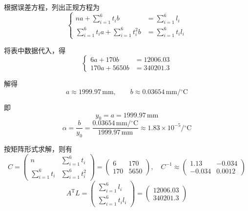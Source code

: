 \documentclass[UTF8,zihao=-4]{ctexart}
\begin{document}
根据误差方程，列出正规方程为
\begin{equation*}
\left\{
\begin{aligned}
    na+\sum_{i=1}^{6}t_i b&=\sum_{i=1}^{6}l_i\\
    \sum_{i=1}^{6}t_i a+\sum_{i=1}^{6}t_i^2 b&=\sum_{i=1}^{6}t_i l_i
\end{aligned}
\right.
\end{equation*}

将表中数据代入，得
\begin{equation*}
\left\{
\begin{aligned}
    6a+170b&=12006.03\\
    170a+5650b&=340201.3
\end{aligned}
\right.
\end{equation*}

解得
\begin{equation*}
    a\approx1999.97\,\mathrm{mm},
    \qquad
    b\approx0.03654\,\mathrm{mm}/{}^\circ\mathrm{C}
\end{equation*}

即
\begin{equation*}
    y_0=a=1999.97\,\mathrm{mm}
\end{equation*}
\begin{equation*}
    \alpha=\frac{b}{y_0}
    =
    \frac{0.03654\,\mathrm{mm}/{}^\circ\mathrm{C}}{1999.97\,\mathrm{mm}}
    \approx1.83\times10^{-5}/{}^\circ\mathrm{C}
\end{equation*}

按矩阵形式求解，则有
\begin{equation*}
    C=
    \begin{pmatrix}
        n & \displaystyle\sum_{i=1}^{6}t_i\\
        \displaystyle\sum_{i=1}^{6}t_i & \displaystyle\sum_{i=1}^{6}t_i^2
    \end{pmatrix}
    =
    \begin{pmatrix}
        6 & 170\\
        170 & 5650
    \end{pmatrix}
,\quad
    C^{-1}\approx
    \begin{pmatrix}
        1.13 & -0.034\\
        -0.034 & 0.0012
    \end{pmatrix}
\end{equation*}
\begin{equation*}
    A^{\mathrm{T}}L=
    \begin{pmatrix}
        \displaystyle\sum_{i=1}^{6}l_i\\
        \displaystyle\sum_{i=1}^{6}t_i l_i
    \end{pmatrix}
    =
    \begin{pmatrix}
        12006.03\\
        340201.3
    \end{pmatrix}
\end{equation*}
\end{document}
